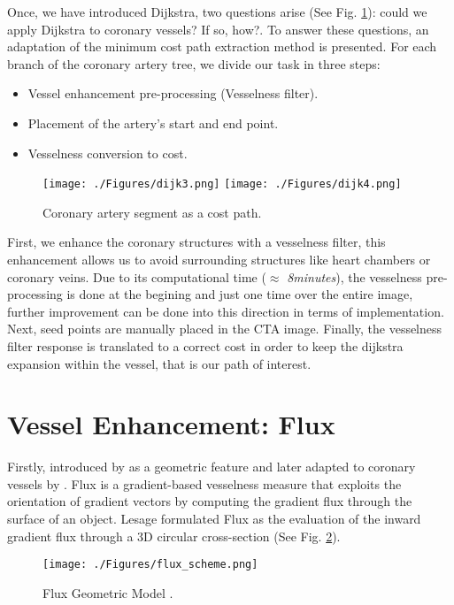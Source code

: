 Once, we have introduced Dijkstra, two questions arise (See Fig. \ref{fig:dijk3_vs_dijk4}): could we apply Dijkstra to coronary vessels? If so, how?.
To answer these questions, an adaptation of the minimum cost path extraction method \citep{Metz2009} is presented.
For each branch of the coronary artery tree, we divide our task in three steps: 
\begin{itemize}
	\item Vessel enhancement pre-processing (Vesselness filter).
	\item Placement of the artery's start and end point.
	\item Vesselness conversion to cost.
\end{itemize}

\begin{figure}[ht]
	\centering
		\texttt{[image: ./Figures/dijk3.png]}
		\texttt{[image: ./Figures/dijk4.png]}
	\caption[Coronary Artery Segment as a Cost Path]{Coronary artery segment as a cost path.}
	\label{fig:dijk3_vs_dijk4}
\end{figure}

First, we enhance the coronary structures with a vesselness filter, this enhancement allows us to avoid surrounding structures like heart chambers or coronary veins. Due to its computational time ($\approx$ \textit{8minutes}), the vesselness pre-processing is done at the begining and just one time over the entire image, further improvement can be done into this direction in terms of implementation.
Next, seed points are manually placed in the CTA image. Finally, the vesselness filter response is translated to a correct cost in order to keep the dijkstra expansion within the vessel, that is our path of interest.

\section{Vessel Enhancement: Flux}\label{cent:flu}

Firstly, introduced by \citep{Vasilevskiy2001} as a geometric feature and later adapted to coronary vessels by \citep{Lesage2009a}. Flux is a gradient-based vesselness measure that exploits the orientation of gradient vectors by computing the gradient flux through the surface of an object. Lesage formulated Flux as the evaluation of the inward gradient flux through a 3D circular cross-section (See Fig. \ref{fig:fl_sch}).

\begin{figure}[ht]
	\centering
		\texttt{[image: ./Figures/flux\_scheme.png]}
	\caption[Flux Geometric Model]{Flux Geometric Model \citep{Lesage2009a}.}
	\label{fig:fl_sch}
\end{figure}

